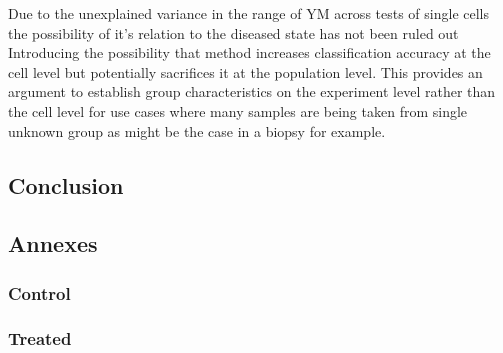 \documentclass[
  paper=a4,
  ,captions=tableheading
]{scrartcl}
\begin{document}
Due to the unexplained variance in the range of YM across tests of
single cells the possibility of it's relation to the diseased state has
not been ruled out Introducing the possibility that method increases
classification accuracy at the cell level but potentially sacrifices it
at the population level. This provides an argument to establish group
characteristics on the experiment level rather than the cell level for
use cases where many samples are being taken from single unknown group
as might be the case in a biopsy for example.

\subsection{Conclusion}\label{conclusion}

\subsection{Annexes}\label{annexes}

\subsubsection{Control}\label{control}

{} {} {} {} {} {} {} {} {} {} {}

\subsubsection{Treated}\label{treated}

{} {} {} {}
\end{document}
